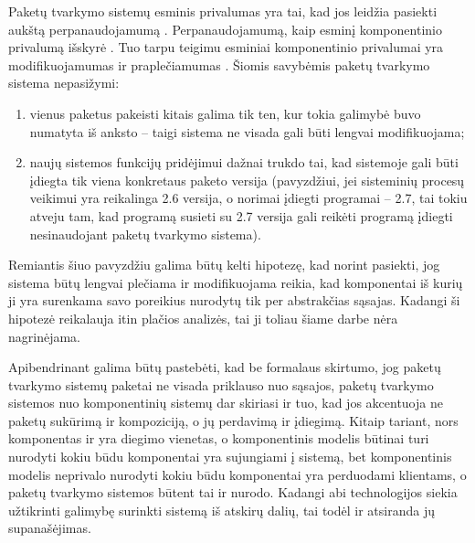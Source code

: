 Paketų tvarkymo sistemų esminis privalumas yra tai, kad jos leidžia
pasiekti aukštą perpanaudojamumą . Perpanaudojamumą,
kaip esminį komponentinio privalumą išskyrė 
\cite{what-to-compose}.
Tuo tarpu  \cite{point-counterpoint}
teigimu esminiai komponentinio privalumai yra modifikuojamumas
 ir praplečiamumas . Šiomis
savybėmis  paketų tvarkymo sistema nepasižymi:
\begin{enumerate}
  \item vienus paketus pakeisti kitais galima tik ten, kur tokia galimybė
    buvo numatyta iš anksto – taigi sistema ne visada gali būti
    lengvai modifikuojama;
  \item naujų sistemos funkcijų pridėjimui dažnai trukdo tai,
    kad sistemoje gali būti įdiegta tik viena konkretaus paketo
    versija (pavyzdžiui, jei sisteminių procesų veikimui yra reikalinga
    2.6  versija, o norimai įdiegti programai – 2.7,
    tai tokiu atveju tam, kad programą susieti su 2.7 versija gali
    reikėti programą įdiegti nesinaudojant paketų tvarkymo sistema).
\end{enumerate}
Remiantis šiuo pavyzdžiu galima būtų kelti hipotezę, kad norint
pasiekti, jog sistema būtų lengvai plečiama ir modifikuojama reikia,
kad komponentai iš kurių ji yra surenkama savo poreikius nurodytų
tik per abstrakčias sąsajas. Kadangi ši hipotezė reikalauja itin
plačios analizės, tai ji toliau šiame darbe nėra nagrinėjama.

Apibendrinant galima būtų pastebėti, kad be formalaus skirtumo, jog
paketų tvarkymo sistemų paketai ne visada priklauso nuo sąsajos,
paketų tvarkymo sistemos nuo komponentinių sistemų dar skiriasi ir
tuo, kad jos akcentuoja ne paketų sukūrimą ir kompoziciją, o jų
perdavimą ir įdiegimą. Kitaip tariant, nors komponentas ir yra
diegimo vienetas, o komponentinis modelis būtinai turi nurodyti
kokiu būdu komponentai yra sujungiami į sistemą, bet komponentinis
modelis neprivalo nurodyti kokiu būdu komponentai yra perduodami
klientams, o paketų tvarkymo sistemos būtent tai ir nurodo. Kadangi
abi technologijos siekia užtikrinti galimybę surinkti sistemą
iš atskirų dalių, tai todėl ir atsiranda jų supanašėjimas.
